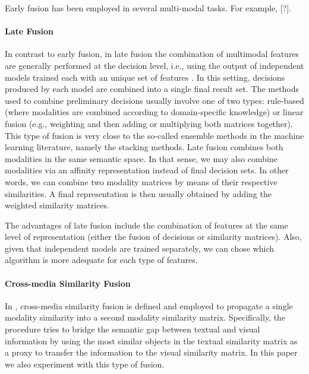 \documentclass{llncs}
\begin{document}

%
Early fusion has been employed in several multi-modal tasks. For example, [?]. 
\paragraph{Late Fusion}
In contrast to early fusion, in late fusion the combination of multimodal features are generally performed at the decision level, i.e., using the output of independent models trained  each with an unique set of features \cite{ClinchantAC11}. In this setting,  decisions produced by each model are combined into a single final result set.
%
The methods used to combine preliminary decisions usually involve one of two types: rule-based (where modalities are combined according to domain-specific knowledge) or linear fusion (e.g., weighting and then adding or multiplying both matrices together). This type of fusion is very close to the so-called ensemble methods in the machine learning literature, namely the stacking methods.
%
Late fusion combines both modalities in the same semantic space. In that sense,  we may also combine modalities via an affinity representation instead of final decision sets. In other words, we can combine two modality matrices by means of their respective similarities. A final representation is then usually obtained by adding the weighted similarity matrices.
%

The advantages of late fusion include the combination of features at the same level of representation (either the fusion of decisions or similarity matrices). Also, given that independent models are trained separately, we can chose which algorithm is more adequate for each type of
features.
\paragraph{Cross-media Similarity Fusion}

%
In \cite{Ah-PineCC15}, cross-media similarity fusion is defined and employed to propagate a single modality
similarity into a second modality similarity matrix. Specifically, the procedure tries to bridge the semantic
gap between textual and visual information by using the most similar objects in the textual similarity matrix as a proxy to transfer the information to the visual similarity matrix. In this paper we also experiment with this type of fusion.
\end{document}
